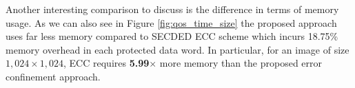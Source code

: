 Another interesting comparison to discuss is the difference in terms of memory usage. As we can also see in Figure \ref{fig:qos_time_size}
the proposed approach uses far less memory compared to SECDED ECC scheme which incurs 18.75\% memory overhead in each protected data word. In particular, for an image of size $1,024 \times 1,024$, ECC requires \textbf{5.99}$\times$ more memory than the proposed error confinement approach.